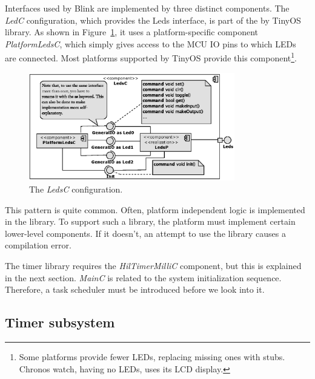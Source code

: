 Interfaces used by Blink are implemented by three distinct components.  The \emph{LedC} configuration, which provides the Leds interface, is part of the by TinyOS library.  As shown in Figure~\ref{fig:ledc}, it uses a platform-specific component \emph{PlatformLedsC}, which simply gives access to the MCU IO pins to which LEDs are connected. Most platforms supported by TinyOS provide this component\footnote{Some platforms provide fewer LEDs, replacing missing ones with stubs. Chronos watch, having no LEDs, uses its LCD display.}.
\begin{figure}[h]
  \centering
  \includegraphics[width=0.8\textwidth]{diagrams/ledsc.eps}
  \caption{The \emph{LedsC} configuration.}
  \label{fig:ledc}
\end{figure}

This pattern is quite common. Often, platform independent logic is implemented in the library. To support such a library, the platform must implement certain lower-level components.  If it doesn't, an attempt to use the library causes a compilation error.

The timer library requires the \emph{HilTimerMilliC} component, but this is explained in the next section. \emph{MainC} is related to the system initialization sequence. Therefore, a task scheduler must be introduced before we look into it.

\subsection{Timer subsystem}
\label{ch:timer_subsystem}


